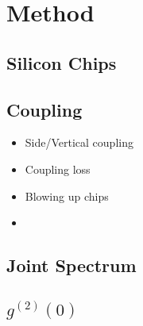 \section{Method}
\subsection{Silicon Chips}
\subsection{Coupling}
\begin{itemize}
\item Side/Vertical coupling
\item Coupling loss
\item Blowing up chips
\item 
\end{itemize}
\subsection{Joint Spectrum}

\subsection{$g^{(2)}(0)$}